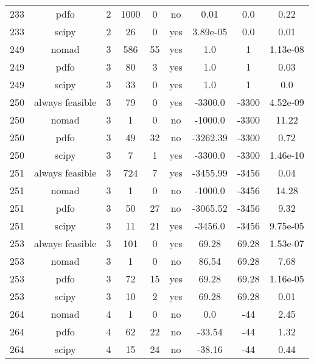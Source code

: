 \begin{scriptsize}
\begin{center}
\begin{longtable}{ccccccccc}
233 &            pdfo &  2 &   1000 &      0 &      no &        0.01 &         0.0 &     0.22\\
233 &           scipy &  2 &     26 &      0 &     yes &    3.89e-05 &         0.0 &     0.01\\
249 &           nomad &  3 &    586 &     55 &     yes &         1.0 &           1 & 1.13e-08\\
249 &            pdfo &  3 &     80 &      3 &     yes &         1.0 &           1 &     0.03\\
249 &           scipy &  3 &     33 &      0 &     yes &         1.0 &           1 &      0.0\\
250 & always feasible &  3 &     79 &      0 &     yes &     -3300.0 &       -3300 & 4.52e-09\\
250 &           nomad &  3 &      1 &      0 &      no &     -1000.0 &       -3300 &    11.22\\
250 &            pdfo &  3 &     49 &     32 &      no &    -3262.39 &       -3300 &     0.72\\
250 &           scipy &  3 &      7 &      1 &     yes &     -3300.0 &       -3300 & 1.46e-10\\
251 & always feasible &  3 &    724 &      7 &     yes &    -3455.99 &       -3456 &     0.04\\
251 &           nomad &  3 &      1 &      0 &      no &     -1000.0 &       -3456 &    14.28\\
251 &            pdfo &  3 &     50 &     27 &      no &    -3065.52 &       -3456 &     9.32\\
251 &           scipy &  3 &     11 &     21 &     yes &     -3456.0 &       -3456 & 9.75e-05\\
253 & always feasible &  3 &    101 &      0 &     yes &       69.28 &       69.28 & 1.53e-07\\
253 &           nomad &  3 &      1 &      0 &      no &       86.54 &       69.28 &     7.68\\
253 &            pdfo &  3 &     72 &     15 &     yes &       69.28 &       69.28 & 1.16e-05\\
253 &           scipy &  3 &     10 &      2 &     yes &       69.28 &       69.28 &     0.01\\
264 &           nomad &  4 &      1 &      0 &      no &         0.0 &         -44 &     2.45\\
264 &            pdfo &  4 &     62 &     22 &      no &      -33.54 &         -44 &     1.32\\
264 &           scipy &  4 &     15 &     24 &      no &      -38.16 &         -44 &     0.44\\

\end{longtable}
\end{center}
\end{scriptsize}
